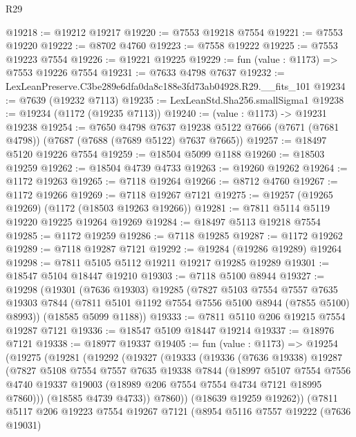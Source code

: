 \begin{lexlean}{R29}
\begin{coremodule}
@19218 := @19212 @19217
@19220 := @7553 @19218 @7554
@19221 := @7553 @19220
@19222 := @8702 @4760
@19223 := @7558 @19222
@19225 := @7553 @19223 @7554
@19226 := @19221 @19225
@19229 := fun (value : @1173) => @7553 @19226 @7554
@19231 := @7633 @4798 @7637
@19232 := LexLeanPreserve.C3be289e6dfa0da8c188e3fd73ab04928.R29.__fits_101
@19234 := @7639 (@19232 @7113)
@19235 := LexLeanStd.Sha256.smallSigma1
@19238 := @19234 (@1172 (@19235 @7113))
@19240 := (value : @1173) -> @19231 @19238
@19254 := @7650
    @4798
    @7637
    @19238
    @5122
    @7666
    (@7671 (@7681 @4798))
    (@7687 (@7688 (@7689 @5122) @7637 @7665))
@19257 := @18497 @5120 @19226 @7554
@19259 := @18504 @5099 @1188
@19260 := @18503 @19259
@19262 := @18504 @4739 @4733
@19263 := @19260 @19262
@19264 := @1172 @19263
@19265 := @7118 @19264
@19266 := @8712 @4760
@19267 := @1172 @19266
@19269 := @7118 @19267 @7121
@19275 := @19257 (@19265 @19269) (@1172 (@18503 @19263 @19266))
@19281 := @7811 @5114 @5119 @19220 @19225 @19264 @19269
@19284 := @18497 @5113 @19218 @7554
@19285 := @1172 @19259
@19286 := @7118 @19285
@19287 := @1172 @19262
@19289 := @7118 @19287 @7121
@19292 := @19284 (@19286 @19289) @19264
@19298 := @7811 @5105 @5112 @19211 @19217 @19285 @19289
@19301 := @18547 @5104 @18447 @19210
@19303 := @7118 @5100 @8944
@19327 := @19298
    (@19301
      (@7636 @19303)
      @19285
      (@7827
        @5103
        @7554
        @7557
        @7635
        @19303
        @7844
        (@7811 @5101 @1192 @7554 @7556 @5100 @8944 (@7855 @5100) @8993))
      (@18585 @5099 @1188))
@19333 := @7811 @5110 @206 @19215 @7554 @19287 @7121
@19336 := @18547 @5109 @18447 @19214
@19337 := @18976 @7121
@19338 := @18977 @19337
@19405 := fun (value : @1173) =>
  @19254
    (@19275
      (@19281
        (@19292
          (@19327
            (@19333
              (@19336
                (@7636 @19338)
                @19287
                (@7827
                  @5108
                  @7554
                  @7557
                  @7635
                  @19338
                  @7844
                  (@18997
                    @5107
                    @7554
                    @7556
                    @4740
                    @19337
                    @19003
                    (@18989 @206 @7554 @7554 @4734 @7121 @18995 @7860)))
                (@18585 @4739 @4733))
              @7860))
          (@18639 @19259 @19262))
        (@7811
          @5117
          @206
          @19223
          @7554
          @19267
          @7121
          (@8954
            @5116
            @7557
            @19222
            (@7636 @19031)

\end{coremodule}
\end{lexlean}
